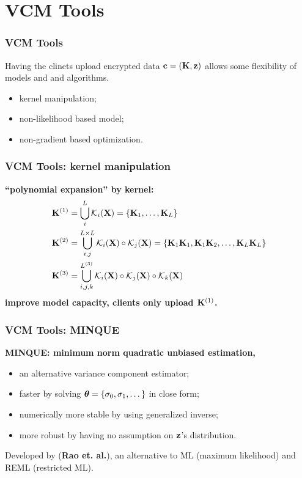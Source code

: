\documentclass{beamer}
\newcommand{\kn}{\mathcal{K}}                         %
\begin{document}
\section{VCM Tools}
\begin{frame}\frametitle{VCM Tools}
  Having the clinets upload encrypted data $\mathbf{c}=(\mathbf{K}, \mathbf{z})$ allows
  some flexibility of models and and algorithms.
  \begin{itemize}
  \item kernel manipulation;
  \item non-likelihood based model;
  \item non-gradient based optimization.
  \end{itemize}
\end{frame}
\begin{frame}\frametitle{VCM Tools: kernel manipulation}
  \textbf{``polynomial expansion'' by kernel:}
  \begin{align*}
    \xk^{(1)} & = \bigcup_{i}^L \kn_i(\xx) = \{\xk_1, \dots, \xk_L\} \\
    \xk^{(2)} & = \bigcup_{i,j}^{L \times L} \kn_i(\xx) \circ \kn_j(\xx) = \{\xk_1\xk_1, \xk_1\xk_2, \dots, \xk_L\xk_L\} \\
    \xk^{(3)} & = \bigcup_{i,j,k}^{L^{(3)}}  \kn_i(\xx) \circ \kn_j(\xx) \circ \kn_k(\xx)
  \end{align*}
  {\color{blue}\textbf{improve model capacity, clients only upload $\mathbf{K}^{(1)}$.}}
\end{frame}
\begin{frame}\frametitle{VCM Tools: \textbf{MINQUE}}
  \textbf{MINQUE: minimum norm quadratic unbiased estimation,}
  \begin{itemize}
  \item  an alternative variance component estimator;
  \item faster by solving $\boldsymbol{\theta}=\{\sigma_0, \sigma_1, \dots \}$ in
    close form;
  \item numerically more stable by using generalized inverse;
  \item more robust by having no assumption on $\mathbf{z}$'s distribution.
  \end{itemize}
  Developed by (\textbf{Rao et. al.}), an alternative to ML (maximum
  likelihood) and REML (restricted ML).
\end{frame}
\end{document}
